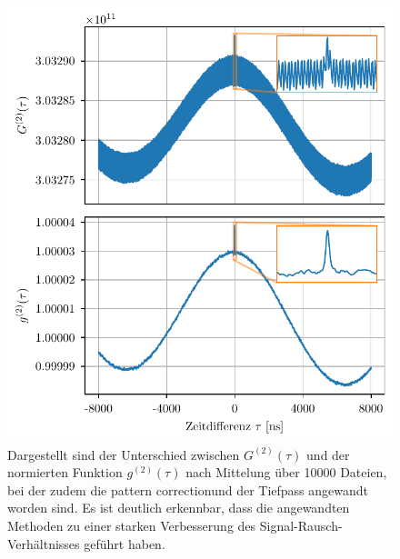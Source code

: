 \begin{figure}[h]
    \centering
    \includegraphics{images/Datenaufnahme/G2_vs_g2.pdf}
    \caption{Dargestellt sind der Unterschied zwischen $G^{(2)}(\tau)$ und der normierten Funktion $g^{(2)}(\tau)$ nach Mittelung über 10000 Dateien, bei der zudem die \glqq pattern correction\grqq\;und der Tiefpass angewandt worden sind. Es ist deutlich erkennbar, dass die angewandten Methoden zu einer starken Verbesserung des Signal-Rausch-Verhältnisses geführt haben. }
    \label{fig:gemittelte G2 vs g2}
\end{figure}

